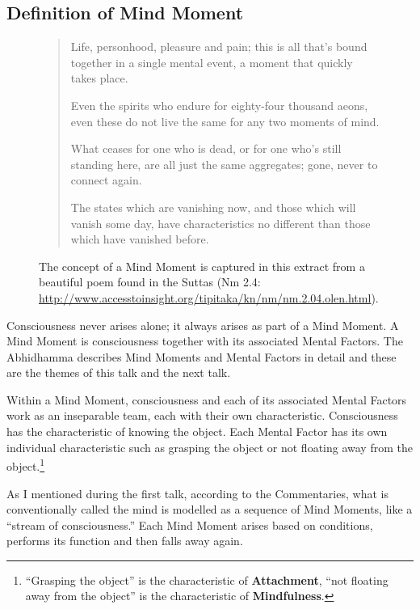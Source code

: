 \subsection*{Definition of Mind Moment}

\begin{figure} [H]

\vspace{-1mm}

\begin{quote}
Life, personhood, pleasure and pain; this is all that's bound together in a single mental event, a moment that quickly takes place.

Even the spirits who endure for eighty-four thousand aeons, even these do not live the same for any two moments of mind.

What ceases for one who is dead, or for one who's still standing here, are all just the same aggregates; gone, never to connect again.

The states which are vanishing now, and those which will vanish some day, have characteristics no different than those which have vanished before.

\end{quote}

\caption{The concept of a Mind Moment is captured in this extract from a beautiful poem found in the Suttas (Nm 2.4: \url{http://www.accesstoinsight.org/tipitaka/kn/nm/nm.2.04.olen.html}).}

\end{figure}

Consciousness never arises alone; it always arises as part of a Mind Moment. A Mind Moment is consciousness together with its associated Mental Factors. The Abhidhamma describes Mind Moments and Mental Factors in detail and these are the themes of this talk and the next talk.

Within a Mind Moment, consciousness and each of its associated Mental Factors work as an inseparable team, each with their own characteristic. Consciousness has the characteristic of knowing the object. Each Mental Factor has its own individual characteristic such as grasping the object or not floating away from the object.\footnote{“Grasping the object” is the characteristic of \textbf{Attachment}, “not floating away from the object” is the characteristic of \textbf{Mindfulness}.}

As I mentioned during the first talk, according to the Commentaries, what is conventionally called the mind is modelled as a sequence of Mind Moments, like a “stream of consciousness.” Each Mind Moment arises based on conditions, performs its function and then falls away again.

